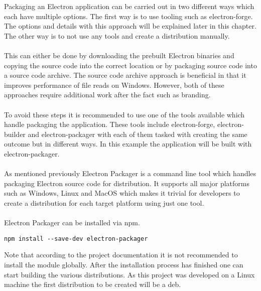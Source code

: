  
Packaging an Electron application can be carried out in two different ways which each have multiple options.
The first way is to use tooling such as electron-forge. 
The options and details with this approach will be explained later in this chapter.
The other way is to not use any tools and create a distribution manually.\paragraph{}
This can either be done by downloading the prebuilt Electron binaries and copying the 
source code into the correct location or by packaging source code into a source code archive.
The source code archive approach is beneficial in that it improves performance of file reads
on Windows. 
However, both of these approaches require additional work after the fact such as branding. \parencite{electronDocsDist}\paragraph{}
To avoid these steps it is recommended to use one of the tools available which handle packaging
the application.
These tools include electron-forge, electron-builder and electron-packager with each of them
tasked with creating the same outcome but in different ways.
In this example the application will be built with electron-packager.\paragraph{}
As mentioned previously Electron Packager is a command line tool which handles packaging 
Electron source code for distribution. 
It supports all major platforms such as Windows, Linux and MacOS which makes it trivial
for developers to create a distribution for each target platform using just one tool. \parencite{electronPackager}\paragraph{}
Electron Packager can be installed via \acrshort{npm}.
\begin{lstlisting}[caption=Installing Electron Packager]
npm install --save-dev electron-packager
\end{lstlisting}
Note that according to the project documentation it is not recommended to install the module globally. \parencite{electronPackager}
After the installation process has finished one can start building the various distributions. 
As this project was developed on a Linux machine the first distribution to be created will be a \acrfull{deb}.
